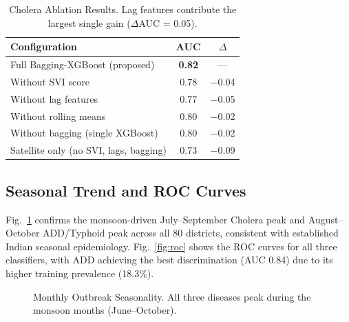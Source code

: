 \documentclass[conference]{IEEEtran}
\begin{document}
\begin{table}[!t]
\caption{Cholera Ablation Results. Lag features contribute the largest single gain ($\Delta$AUC = 0.05).}
\label{tab:ablation}
\centering
\renewcommand{\arraystretch}{1.15}
\begin{tabular}{|l|c|c|}
\hline
\textbf{Configuration} & \textbf{AUC} & \textbf{$\Delta$} \\
\hline
Full Bagging-XGBoost (proposed)       & \textbf{0.82} & --- \\
Without SVI score                     & 0.78 & $-$0.04 \\
Without lag features                  & 0.77 & $-$0.05 \\
Without rolling means                 & 0.80 & $-$0.02 \\
Without bagging (single XGBoost)      & 0.80 & $-$0.02 \\
Satellite only (no SVI, lags, bagging)& 0.73 & $-$0.09 \\
\hline
\end{tabular}
\end{table}

\subsection{Seasonal Trend and ROC Curves}

Fig.~\ref{fig:seasonal} confirms the monsoon-driven July--September
Cholera peak and August--October ADD/Typhoid peak across all 80
districts, consistent with established Indian seasonal epidemiology.
Fig.~\ref{fig:roc} shows the ROC curves for all three classifiers,
with ADD achieving the best discrimination (AUC 0.84) due to its higher
training prevalence (18.3\%).

\begin{figure}[!t]
\centering
{}
\caption{Monthly Outbreak Seasonality. All three diseases peak during the monsoon months (June--October).}
\label{fig:seasonal}
\end{figure}
\end{document}

